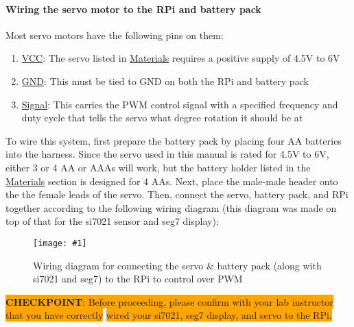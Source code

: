 \documentclass{article}
\newcommand{\imagefigb}[2]{
    \begin{figure}[H]
        \centering
        \texttt{[image: \#1]}
        \caption{#2}
    \end{figure}
}
\newcommand{\checkpoint}[2]{
    \newline \newline
    \noindent
    \colorbox{Orange}{\textbf{CHECKPOINT}: #1} \newline \colorbox{Orange}{#2}
    \newline \newline
}
\begin{document}
    \paragraph{Wiring the servo motor to the RPi and battery pack}
    Most servo motors have the following pins on them:
    \begin{enumerate}
      \item \underline{VCC}: The servo listed in \hyperref[sec:materials]{Materials} requires a positive supply of 4.5V to 6V
      \item \underline{GND}: This must be tied to GND on both the RPi and battery pack
      \item \underline{Signal}: This carries the PWM control signal with a specified frequency and duty cycle that tells the servo what degree rotation it should be at
    \end{enumerate}
    To wire this system, first prepare the battery pack by placing four AA batteries into the harness. Since the servo used in this manual is rated for 4.5V to 6V, either 3 or 4 AA or AAAs will work, but the battery holder listed in the \hyperref[sec:materials]{Materials} section is designed for 4 AAs.
    \newline
    \indent
    Next, place the male-male header onto the the female leads of the servo. Then, connect the servo, battery pack, and RPi together according to the following wiring diagram (this diagram was made on top of that for the si7021 sensor and seg7 display):
    \imagefigb{si7021-seg7-servo-wiring-diagram-v2.png}{Wiring diagram for connecting the servo \& battery pack (along with si7021 and seg7) to the RPi to control over PWM}
    \checkpoint{Before proceeding, please confirm with your lab instructor that you have correctly}{wired your si7021, seg7 display, and servo to the RPi.}
\end{document}

